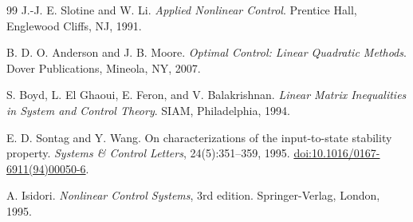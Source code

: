\documentclass[11pt, a4paper, UTF8, fontset=none]{ctexart}
\theoremstyle{cnthm}
\begin{document}
\begin{thebibliography}{99}
J.-J. E. Slotine and W. Li.
\newblock \emph{Applied Nonlinear Control}.
\newblock Prentice Hall, Englewood Cliffs, NJ, 1991.

B. D. O. Anderson and J. B. Moore.
\newblock \emph{Optimal Control: Linear Quadratic Methods}.
\newblock Dover Publications, Mineola, NY, 2007.

S. Boyd, L. El Ghaoui, E. Feron, and V. Balakrishnan.
\newblock \emph{Linear Matrix Inequalities in System and Control Theory}.
\newblock SIAM, Philadelphia, 1994.

E. D. Sontag and Y. Wang.
\newblock On characterizations of the input-to-state stability property.
\newblock \emph{Systems \& Control Letters}, 24(5):351--359, 1995.
\newblock \href{https://doi.org/10.1016/0167-6911(94)00050-6}{doi:10.1016/0167-6911(94)00050-6}.

A. Isidori.
\newblock \emph{Nonlinear Control Systems}, 3rd edition.
\newblock Springer-Verlag, London, 1995.

\end{thebibliography}
\end{document}
